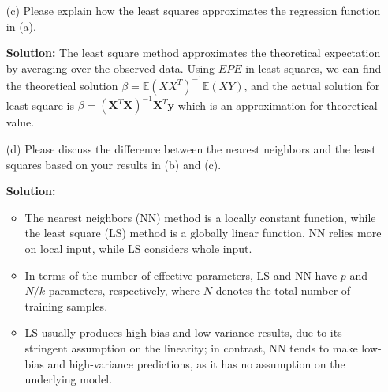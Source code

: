 \documentclass[10pt]{article}
\begin{document}
\begin{enumerate}[1.]
\begin{itemize}
			
			
			
			\item[(c)] Please explain how the least squares approximates the regression function in (a).~
			
			\textbf{Solution:} The least square method approximates the theoretical expectation by averaging over 
			the observed data. Using $EPE$ in least squares, we can find the theoretical solution $\beta = \mathbb{E}(XX^T)^{-1}\mathbb{E}(XY)$, 
			and the actual solution for least square is $\beta = \left(\mathbf{X}^{T} \mathbf{X}\right)^{-1} \mathbf{X}^{T} \mathbf{y}$ 
			which is an approximation for theoretical value.\\
			
			
			
			
			
			\item[(d)] Please discuss the difference between the nearest neighbors and the least squares based on your results in (b) and (c).~ 
			
			\textbf{Solution:} 
			\begin{itemize}
				\item The nearest neighbors (NN) method is a locally constant function, 
			while the least square (LS) method is a globally linear function. 
			NN relies more on local input, while LS considers whole input.
			\item In terms of the number of effective parameters, LS and NN have $p$ and $N/k$ parameters, respectively,
			where $N$ denotes the total number of training samples.
			\item LS usually produces high-bias and low-variance results, due to its stringent assumption on the linearity;
			in contrast, NN tends to make low-bias and high-variance predictions, as it has no assumption on the underlying model.
			\end{itemize}
			
			
			
		\end{itemize}




\end{enumerate}
\end{document}
